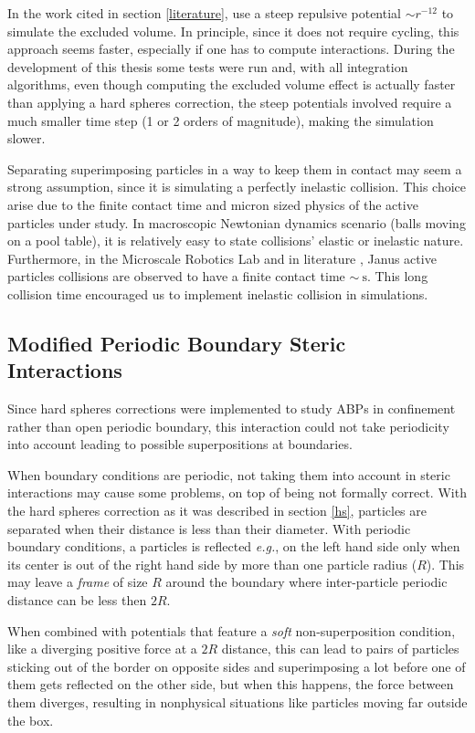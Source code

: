 \documentclass[../../master_thesis_np.tex]{subfiles}
\begin{document}
	In the work cited in section \ref{literature}, \citeauthor{martin-gomez_collective_2018} use a steep repulsive potential $\sim r^{-12}$ to simulate the excluded volume.
	In principle, since it does not require cycling, this approach seems faster, especially if one has to compute interactions.
	During the development of this thesis some tests were run and, with all integration algorithms, even though computing the excluded volume effect is actually faster than applying a hard spheres correction, the steep potentials involved require a much smaller time step (1 or 2 orders of magnitude), making the simulation slower.
	
	Separating superimposing particles in a way to keep them in contact may seem a strong assumption, since it is simulating a perfectly inelastic collision.
	This choice arise due to the finite contact time and micron sized physics of the active particles under study.
	In macroscopic Newtonian dynamics scenario (balls moving on a pool table), it is relatively easy to state collisions' elastic or inelastic nature.
	Furthermore, in the Microscale Robotics Lab and in literature \cite{singh_pair_2024}, Janus active particles collisions are observed to have a finite contact time $\sim\SI{}{\second}$.
	This long collision time encouraged us to implement inelastic collision in simulations.
	
	\subsection{Modified Periodic Boundary Steric Interactions}
	Since hard spheres corrections were implemented to study ABPs in confinement rather than open periodic boundary, this interaction could not take periodicity into account leading to possible superpositions at boundaries.
	
	When boundary conditions are periodic, not taking them into account in steric interactions may cause some problems, on top of being not formally correct.
	With the hard spheres correction as it was described in section \ref{hs}, particles are separated when their distance is less than their diameter.
	With periodic boundary conditions, a particles is reflected {\it e.g.}, on the left hand side only when its center is out of the right hand side by more than one particle radius ($R$).
	This may leave a \emph{frame} of size $R$ around the boundary where inter-particle periodic distance can be less then $2R$. 
	
	When combined with potentials that feature a \emph{soft} non-superposition condition, like a diverging positive force at a $2R$ distance, this can lead to pairs of particles sticking out of the border on opposite sides and superimposing a lot before one of them gets reflected on the other side, but when this happens, the force between them diverges, resulting in nonphysical situations like particles moving far outside the box.
	
\end{document}
